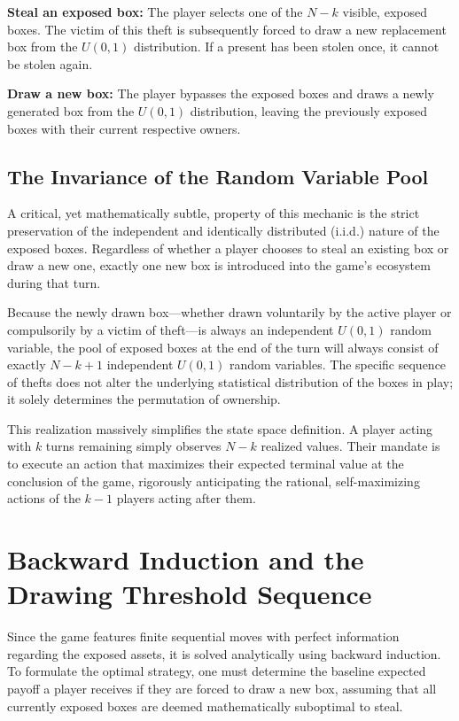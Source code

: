 \documentclass{article}
\begin{document}
\textbf{Steal an exposed box:} The player selects one of the $N - k$ visible, exposed boxes.
The victim of this theft is subsequently forced to draw a new replacement box from the $U(0,1)$ distribution.
If a present has been stolen once, it cannot be stolen again.

\textbf{Draw a new box:} The player bypasses the exposed boxes and draws a newly generated box from the $U(0,1)$ distribution, leaving the previously exposed boxes with their current respective owners.

\subsection{The Invariance of the Random Variable Pool}

A critical, yet mathematically subtle, property of this mechanic is the strict preservation of the independent and identically distributed (i.i.d.) nature of the exposed boxes.
Regardless of whether a player chooses to steal an existing box or draw a new one, exactly one new box is introduced into the game's ecosystem during that turn.

Because the newly drawn box—whether drawn voluntarily by the active player or compulsorily by a victim of theft—is always an independent $U(0,1)$ random variable, the pool of exposed boxes at the end of the turn will always consist of exactly $N - k + 1$ independent $U(0,1)$ random variables.
The specific sequence of thefts does not alter the underlying statistical distribution of the boxes in play; it solely determines the permutation of ownership.

This realization massively simplifies the state space definition.
A player acting with $k$ turns remaining simply observes $N - k$ realized values.
Their mandate is to execute an action that maximizes their expected terminal value at the conclusion of the game, rigorously anticipating the rational, self-maximizing actions of the $k - 1$ players acting after them.


\section{Backward Induction and the Drawing Threshold Sequence}\label{sec:threshold}

Since the game features finite sequential moves with perfect information regarding the exposed assets, it is solved analytically using backward induction. To formulate the optimal strategy, one must determine the baseline expected payoff a player receives if they are forced to draw a new box, assuming that all currently exposed boxes are deemed mathematically suboptimal to steal.
\end{document}
